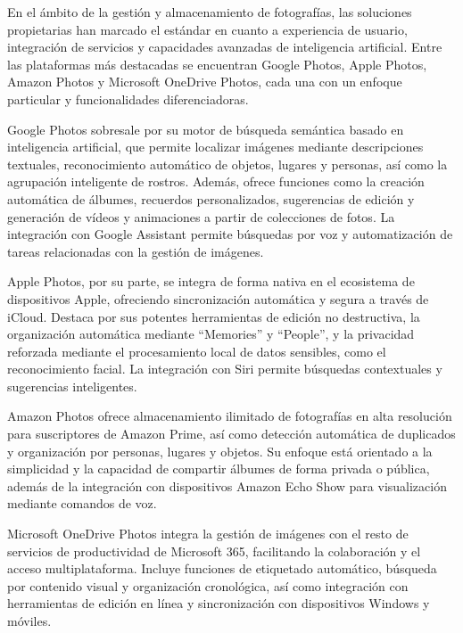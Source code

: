 En el ámbito de la gestión y almacenamiento de fotografías, las soluciones propietarias han marcado el estándar en cuanto a experiencia de usuario, integración de servicios y capacidades avanzadas de inteligencia artificial. Entre las plataformas más destacadas se encuentran Google Photos, Apple Photos, Amazon Photos y Microsoft OneDrive Photos, cada una con un enfoque particular y funcionalidades diferenciadoras.

Google Photos sobresale por su motor de búsqueda semántica basado en inteligencia artificial, que permite localizar imágenes mediante descripciones textuales, reconocimiento automático de objetos, lugares y personas, así como la agrupación inteligente de rostros. Además, ofrece funciones como la creación automática de álbumes, recuerdos personalizados, sugerencias de edición y generación de vídeos y animaciones a partir de colecciones de fotos. La integración con Google Assistant permite búsquedas por voz y automatización de tareas relacionadas con la gestión de imágenes.

Apple Photos, por su parte, se integra de forma nativa en el ecosistema de dispositivos Apple, ofreciendo sincronización automática y segura a través de iCloud. Destaca por sus potentes herramientas de edición no destructiva, la organización automática mediante “Memories” y “People”, y la privacidad reforzada mediante el procesamiento local de datos sensibles, como el reconocimiento facial. La integración con Siri permite búsquedas contextuales y sugerencias inteligentes.

Amazon Photos ofrece almacenamiento ilimitado de fotografías en alta resolución para suscriptores de Amazon Prime, así como detección automática de duplicados y organización por personas, lugares y objetos. Su enfoque está orientado a la simplicidad y la capacidad de compartir álbumes de forma privada o pública, además de la integración con dispositivos Amazon Echo Show para visualización mediante comandos de voz.

Microsoft OneDrive Photos integra la gestión de imágenes con el resto de servicios de productividad de Microsoft 365, facilitando la colaboración y el acceso multiplataforma. Incluye funciones de etiquetado automático, búsqueda por contenido visual y organización cronológica, así como integración con herramientas de edición en línea y sincronización con dispositivos Windows y móviles.

